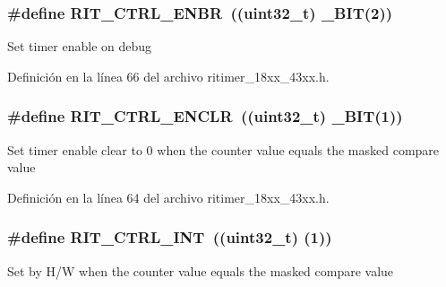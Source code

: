 \subsubsection[{\texorpdfstring{R\+I\+T\+\_\+\+C\+T\+R\+L\+\_\+\+E\+N\+BR}{RIT_CTRL_ENBR}}]{\setlength{\rightskip}{0pt plus 5cm}\#define R\+I\+T\+\_\+\+C\+T\+R\+L\+\_\+\+E\+N\+BR~((uint32\+\_\+t) {\bf \+\_\+\+B\+IT}(2))}\hypertarget{group___r_i_t_i_m_e_r__18_x_x__43_x_x_ga5b766561bf28441b64bc533325e43be0}{}\label{group___r_i_t_i_m_e_r__18_x_x__43_x_x_ga5b766561bf28441b64bc533325e43be0}
Set timer enable on debug 

Definición en la línea 66 del archivo ritimer\+\_\+18xx\+\_\+43xx.\+h.

\subsubsection[{\texorpdfstring{R\+I\+T\+\_\+\+C\+T\+R\+L\+\_\+\+E\+N\+C\+LR}{RIT_CTRL_ENCLR}}]{\setlength{\rightskip}{0pt plus 5cm}\#define R\+I\+T\+\_\+\+C\+T\+R\+L\+\_\+\+E\+N\+C\+LR~((uint32\+\_\+t) {\bf \+\_\+\+B\+IT}(1))}\hypertarget{group___r_i_t_i_m_e_r__18_x_x__43_x_x_ga16cdab6f304738d645d704ae2d161412}{}\label{group___r_i_t_i_m_e_r__18_x_x__43_x_x_ga16cdab6f304738d645d704ae2d161412}
Set timer enable clear to 0 when the counter value equals the masked compare value 

Definición en la línea 64 del archivo ritimer\+\_\+18xx\+\_\+43xx.\+h.

\subsubsection[{\texorpdfstring{R\+I\+T\+\_\+\+C\+T\+R\+L\+\_\+\+I\+NT}{RIT_CTRL_INT}}]{\setlength{\rightskip}{0pt plus 5cm}\#define R\+I\+T\+\_\+\+C\+T\+R\+L\+\_\+\+I\+NT~((uint32\+\_\+t) (1))}\hypertarget{group___r_i_t_i_m_e_r__18_x_x__43_x_x_ga35abb740dd6c6be63ef5ee80db909f48}{}\label{group___r_i_t_i_m_e_r__18_x_x__43_x_x_ga35abb740dd6c6be63ef5ee80db909f48}
Set by H/W when the counter value equals the masked compare value 

